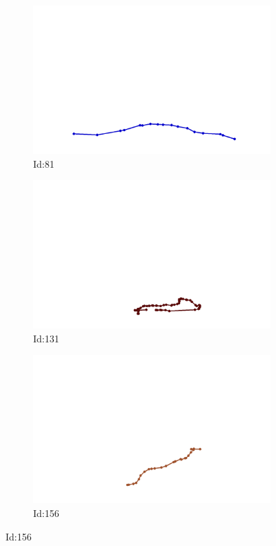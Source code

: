 \documentclass[12pt,twoside]{report}
\begin{document}
\begin{figure}
\centering
\begin{subfigure}[b]{0.20\textwidth}
\centering
\includegraphics[width=\textwidth]{../../trajectories/81.png}
\caption{Id:81}
\end{subfigure}
\begin{subfigure}[b]{0.20\textwidth}
\centering
\includegraphics[width=\textwidth]{../../trajectories/131.png}
\caption{Id:131}
\end{subfigure}
\begin{subfigure}[b]{0.20\textwidth}
\centering
\includegraphics[width=\textwidth]{../../trajectories/156.png}
\caption{Id:156}
\end{subfigure}
\end{figure}
\end{document}
